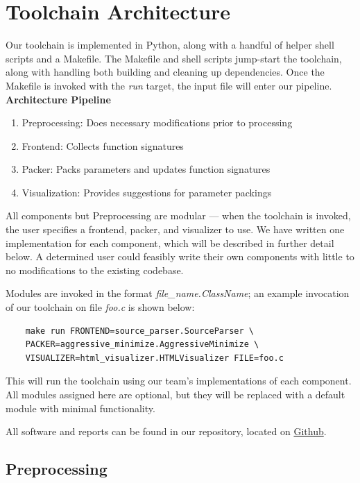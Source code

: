 \documentclass{article}
\begin{document}
\section{Toolchain Architecture}

\noindent Our toolchain is implemented in Python, along with a handful of helper shell scripts and a Makefile. The Makefile and shell scripts jump-start the toolchain, along with handling both building and cleaning up dependencies. Once the Makefile is invoked with the \textit{run} target, the input file will enter our pipeline.
\newline\newline
\noindent\textbf{Architecture Pipeline}
\begin{enumerate}
    \item Preprocessing:  Does necessary modifications prior to processing
    \item Frontend: Collects function signatures
    \item Packer: Packs parameters and updates function signatures
    \item Visualization: Provides suggestions for parameter packings
\end{enumerate}

\noindent All components but Preprocessing are modular --- when the toolchain is invoked, the user specifies a frontend, packer, and visualizer to use. We have written one implementation for each component, which will be described in further detail below. A determined user could feasibly write their own components with little to no modifications to the existing codebase. 

Modules are invoked in the format \textit{file\_name.ClassName}; an example invocation of our toolchain on file \textit{foo.c} is shown below:
\begin{verbatim}
    make run FRONTEND=source_parser.SourceParser \
    PACKER=aggressive_minimize.AggressiveMinimize \
    VISUALIZER=html_visualizer.HTMLVisualizer FILE=foo.c
\end{verbatim}

\noindent This will run the toolchain using our team's implementations of each component. All modules assigned here are optional, but they will be replaced with a default module with minimal functionality.

All software and reports can be found in our repository, located on \href{https://github.com/jbettencourt10/parameter-packing-621}{Github}.


\subsection{Preprocessing}
\end{document}
